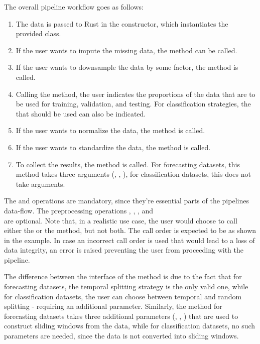 \documentclass[review]{AIM_report}
\begin{document}
The overall pipeline workflow goes as follows:
\begin{enumerate}
    \item The data is passed to Rust in the constructor, which instantiates the provided class.
    \item If the user wants to impute the missing data, the \impute method can be called.
    \item If the user wants to downsample the data by some factor, the \downsample method is called.
    \item Calling the \splitFore method, the user indicates the proportions of the data that are to be used for training, validation, and testing. For classification strategies, the \splitStrategy that should be used can also be indicated.
    \item If the user wants to normalize the data, the \normalize method is called.
    \item If the user wants to standardize the data, the \standardize method is called.
    \item To collect the results, the \collect method is called. For forecasting datasets, this method takes three arguments (\pastWindow, \futureHorizon, \stride), for classification datasets, this does not take arguments.
\end{enumerate}

The \splitShort and \collect operations are mandatory, since they're essential parts of the pipelines data-flow. The preprocessing operations \impute, \downsample, \normalize, and \\\standardize are optional. Note that, in a realistic use case, the user would choose to call either the \normalize or the \standardize method, but not both. The call order is expected to be as shown in the example. In case an incorrect call order is used that would lead to a loss of data integrity, an error is raised preventing the user from proceeding with the pipeline.

The difference between the interface of the \splitShort method is due to the fact that for forecasting datasets, the temporal splitting strategy is the only valid one, while for classification datasets, the user can choose between temporal and random splitting - requiring an additional parameter. Similarly, the \collect method for forecasting datasets takes three additional parameters (\pastWindow, \futureHorizon, \stride) that are used to construct sliding windows from the data, while for classification datasets, no such parameters are needed, since the data is not converted into sliding windows.
\end{document}
